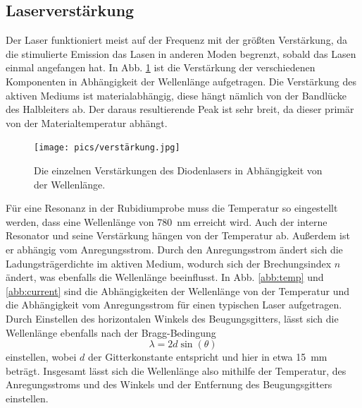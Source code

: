 \subsection{Laserverstärkung}

Der Laser funktioniert meist auf der Frequenz mit der größten Verstärkung, da die stimulierte Emission das Lasen in anderen Moden begrenzt, sobald das Lasen einmal angefangen hat.
In Abb. \ref{abb:verstärker} ist die Verstärkung der verschiedenen Komponenten in Abhängigkeit der Wellenlänge aufgetragen. Die Verstärkung des aktiven Mediums ist materialabhängig, diese hängt nämlich von der Bandlücke des Halbleiters ab. Der daraus resultierende Peak ist sehr breit, da dieser primär von der Materialtemperatur abhängt.

\begin{figure}
    \centering
    \texttt{[image: pics/verstärkung.jpg]}
    \caption{Die einzelnen Verstärkungen des Diodenlasers in Abhängigkeit von der Wellenlänge. \cite{anleitung}}
    \label{abb:verstärker}
\end{figure}

Für eine Resonanz in der Rubidiumprobe muss die Temperatur so eingestellt werden, dass eine Wellenlänge von \SI{780}{\nm} erreicht wird. Auch der interne Resonator und seine Verstärkung hängen von der Temperatur ab. Außerdem ist er abhängig vom Anregungsstrom. Durch den Anregungsstrom ändert sich die Ladungsträgerdichte im aktiven Medium, wodurch sich der Brechungsindex $n$ ändert, was ebenfalls die Wellenlänge beeinflusst. In Abb. \ref{abb:temp} und \ref{abb:current} sind die Abhängigkeiten der Wellenlänge von der Temperatur und die Abhängigkeit vom Anregungsstrom für einen typischen Laser aufgetragen. Durch Einstellen des horizontalen Winkels des Beugungsgitters, lässt sich die Wellenlänge ebenfalls  nach der Bragg-Bedingung
\begin{equation*}
    \lambda = 2d \sin(\theta)
\end{equation*}
einstellen, wobei $d$ der Gitterkonstante entspricht und hier in etwa \SI{15}{\mm} beträgt. Insgesamt lässt sich die Wellenlänge also mithilfe der Temperatur, des Anregungsstroms und des Winkels und der Entfernung des Beugungsgitters einstellen.

